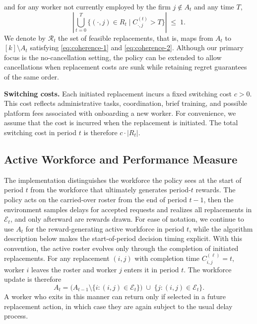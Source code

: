 \documentclass[opre,blindrev]{informs3}
\begin{document}
and for any worker not currently employed by the firm \(j \notin A_t\) and any time \(T\),
\begin{equation}\label{eq:coherence-2}
    \left|\bigcup_{t=0}^T\{(\cdot,j)\in R_t \mid C_{\cdot,j}^{(t)}>T\}\right|
    \;\leq\; 1.
\end{equation}
We denote by \(\mathcal{R}_t\) the set of feasible replacements, that is, maps from \(A_t\) to \([k]\setminus A_t\) satisfying \eqref{eq:coherence-1} and \eqref{eq:coherence-2}. Although our primary focus is the no-cancellation setting, the policy can be extended to allow cancellations when replacement costs are sunk while retaining regret guarantees of the same order.

{\bf Switching costs.} Each initiated replacement incurs a fixed switching cost \(c > 0\). This cost reflects administrative tasks, coordination, brief training, and possible platform fees associated with onboarding a new worker. For convenience, we assume that the cost is incurred when the replacement is initiated. The total switching cost in period \(t\) is therefore \(c \cdot |R_t|\).

\vspace{-.1in}

\subsection{Active Workforce and Performance Measure}
The implementation distinguishes the workforce the policy sees at the start of period \(t\) from the workforce that ultimately generates period-\(t\) rewards. The policy acts on the carried-over roster from the end of period \(t-1\), then the environment samples delays for accepted requests and realizes all replacements in \(\mathcal{E}_t\), and only afterward are rewards drawn. For ease of notation, we continue to use \(A_t\) for the reward-generating active workforce in period \(t\), while the algorithm description below makes the start-of-period decision timing explicit. With this convention, the active roster evolves only through the completion of initiated replacements. For any replacement \((i,j)\) with completion time \(C_{i,j}^{(\ell)} = t\), worker \(i\) leaves the roster and worker \(j\) enters it in period \(t\). The workforce update is therefore
\[
    A_t
    = \big( A_{t-1} \setminus \{  i : (i,j) \in \mathcal{E}_t  \} \big)
      \;\cup\;
      \{  j : (i,j) \in \mathcal{E}_t  \}.
\]
A worker who exits in this manner can return only if selected in a future replacement action, in which case they are again subject to the usual delay process.
\end{document}

